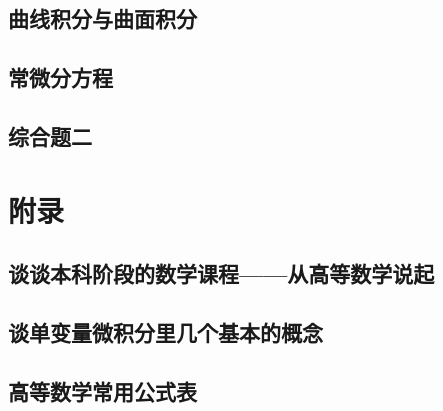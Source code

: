 \documentclass[openany,customfont=true]{HTNotes}
\begin{document}
  \chapter{曲线积分与曲面积分}\label{cha:9}
    

  \chapter{常微分方程}\label{cha:10}

  \chapter*{综合题二}
    

\part{附录}
  \chapter{谈谈本科阶段的数学课程——从高等数学说起}
    

  \chapter{谈单变量微积分里几个基本的概念}
    

  \chapter{高等数学常用公式表}
    

\newpage
\backmatter
\makebackcover
\end{document}

